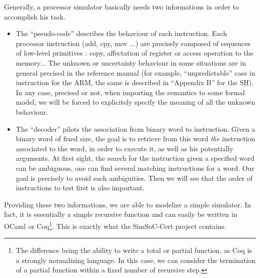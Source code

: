 \documentclass[a4paper, 11pt]{article}
\newcommand{\SScert}{SimSoC-Cert\xspace}
\begin{document}
Generally, a processor simulator basically needs two informations in order to accomplish his task.
\begin{itemize}
\item The ``pseudo-code'' describes the behaviour of each instruction. Each processor instruction (add, cpy, mov ...) are precisely composed of sequences of low-level primitives : copy, affectation of register or access operation to the memory... The unknown or uncertainty behaviour in some situations are in general precised in the reference manual (for example, ``unpredictable'' case in instruction for the ARM, the same is described in ``Appendix B'' for the SH). In any case, precised or not, when importing the semantics to some formal model, we will be forced to explicitely specify the meaning of all the unknown behaviour.
\item The ``decoder'' pilots the association from binary word to instruction. Given a binary word of fixed size, the goal is to retrieve from this word \emph{the} instruction associated to the word, in order to execute it, as well as his potentially arguments. At first sight, the search for the instruction given a specified word can be ambiguous, one can find several matching instructions for a word. Our goal is precisely to avoid such ambiguities. Then we will see that the order of instructions to test first is also important.
\end{itemize}
Providing these two informations, we are able to modelize a simple simulator. In fact, it is essentially a simple recursive function and can easily be written in OCaml or Coq\footnote{The difference being the ability to write a total or partial function, as Coq is a strongly normalizing language. %
In this case, we can consider the termination of a partial function within a fixed number of recursive step.
}. This is exactly what the \SScert project contains.
\end{document}

